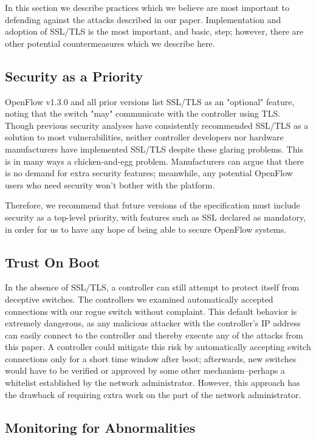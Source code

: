In this section we describe practices which we believe are most important to defending against the attacks described in our paper. Implementation and adoption of SSL/TLS is the most important, and basic, step; however, there are other potential countermeasures which we describe here.

\subsection{Security as a Priority}

OpenFlow v1.3.0 and all prior versions list SSL/TLS as an "optional" feature, noting that the switch "may" communicate with the controller using TLS. Though previous security analyses have consistently recommended SSL/TLS as a solution to most vulnerabilities, neither controller developers nor hardware manufacturers have implemented SSL/TLS despite these glaring problems. This is in many ways a chicken-and-egg problem. Manufacturers can argue that there is no demand for extra security features; meanwhile, any potential OpenFlow users who need security won't bother with the platform.

Therefore, we recommend that future versions of the specification must include security as a top-level priority, with features such as SSL declared as mandatory, in order for us to have any hope of being able to secure OpenFlow systems. 

\subsection{Trust On Boot}

In the absence of SSL/TLS,  a controller can still attempt to protect itself from deceptive switches. The controllers we examined automatically accepted connections with our rogue switch without complaint. This default behavior is extremely dangerous, as any malicious attacker with the controller's IP address can easily connect to the controller and thereby execute any of the attacks from this paper. A controller could mitigate this risk by automatically accepting switch connections only for a short time window after boot; afterwards, new switches would have to be verified or approved by some other mechanism--perhaps a whitelist established by the network administrator. However, this approach has the drawback of requiring extra work on the part of the network administrator.

\subsection{Monitoring for Abnormalities}


